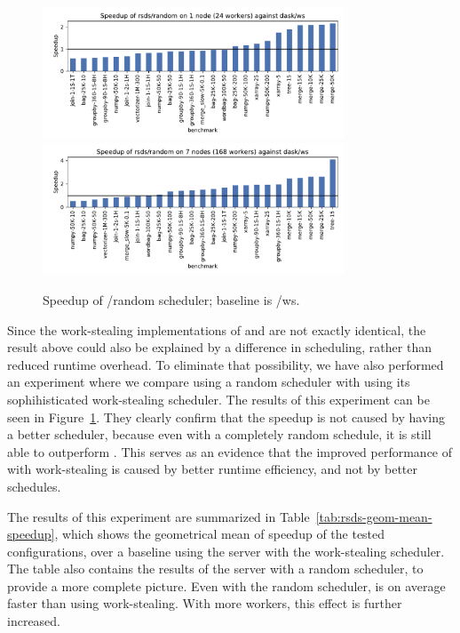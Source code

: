 \begin{figure}
	\centering
	\includegraphics[width=0.8\textwidth]{./imgs/rsds/charts/speedup-rsds-random-1}
	\includegraphics[width=0.8\textwidth]{./imgs/rsds/charts/speedup-rsds-random-7}
	\caption{Speedup of \rsds{}/random scheduler; baseline is \dask{}/ws.}
	\label{fig:rsds-dask-random-all}
\end{figure}

Since the work-stealing implementations of \rsds{} and
\dask{} are not exactly identical, the result above could also be explained by
a difference in scheduling, rather than reduced runtime overhead. To eliminate that possibility, we
have also performed an experiment where we compare \rsds{} using a random
scheduler with \dask{} using its sophihisticated work-stealing scheduler. The
results of this experiment can be seen in Figure~\ref{fig:rsds-dask-random-all}. They clearly confirm
that the speedup is not caused by \rsds{} having a better scheduler, because
even with a completely random schedule, it is still able to outperform \dask{}.
This serves as an evidence that the improved performance of \rsds{} with
work-stealing is caused by better runtime efficiency, and not by better schedules.

The results of this experiment are summarized in Table~\ref{tab:rsds-geom-mean-speedup}, which shows the
geometrical mean of speedup of the tested \rsds{} configurations, over a
baseline using the \dask{} server with the work-stealing scheduler. The table
also contains the results of the \dask{} server with a random scheduler, to
provide a more complete picture. Even with the random scheduler, \rsds{} is on
average faster than \dask{} using work-stealing. With more workers, this effect
is further increased.

